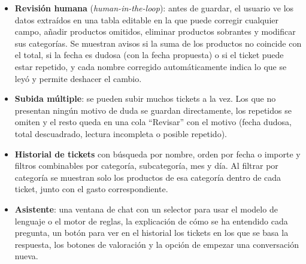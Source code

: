\begin{itemize}
    \item \textbf{Revisión humana} (\textit{human-in-the-loop}): antes de guardar, el usuario ve los datos extraídos en una tabla editable en la que puede corregir cualquier campo, añadir productos omitidos, eliminar productos sobrantes y modificar sus categorías. Se muestran avisos si la suma de los productos no coincide con el total, si la fecha es dudosa (con la fecha propuesta) o si el ticket puede estar repetido, y cada nombre corregido automáticamente indica lo que se leyó y permite deshacer el cambio.
    \item \textbf{Subida múltiple}: se pueden subir muchos tickets a la vez. Los que no presentan ningún motivo de duda se guardan directamente, los repetidos se omiten y el resto queda en una cola \enquote{Revisar} con el motivo (fecha dudosa, total descuadrado, lectura incompleta o posible repetido).
    \item \textbf{Historial de tickets} con búsqueda por nombre, orden por fecha o importe y filtros combinables por categoría, subcategoría, mes y día. Al filtrar por categoría se muestran solo los productos de esa categoría dentro de cada ticket, junto con el gasto correspondiente.
    \item \textbf{Asistente}: una ventana de chat con un selector para usar el modelo de lenguaje o el motor de reglas, la explicación de cómo se ha entendido cada pregunta, un botón para ver en el historial los tickets en los que se basa la respuesta, los botones de valoración y la opción de empezar una conversación nueva.
\end{itemize}
